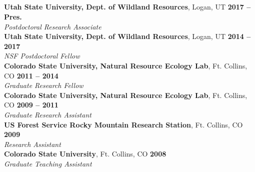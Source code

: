 \documentclass[margin,line]{resume}
\begin{document}
\begin{resume}
    \section{\textmd{\textsf{\color{MidnightBlue}{Professional\\Appointments}}}}
    \textbf{Utah State University, Dept. of Wildland Resources}, Logan, UT  \hfill \textbf{2017 -- Pres.} \\ %
		\textsl{Postdoctoral Research Associate} \vspace{.5mm}\\ 
    \textbf{Utah State University, Dept. of Wildland Resources}, Logan, UT \hfill \textbf{2014 -- 2017} \\
		\textsl{NSF Postdoctoral Fellow} \vspace{.5mm}\\
    \textbf{Colorado State University, Natural Resource Ecology Lab}, Ft. Collins, CO \hfill \textbf{2011 -- 2014}\\
		\textsl{Graduate Research Fellow}\vspace{.5mm}\\ 
    \textbf{Colorado State University, Natural Resource Ecology Lab}, Ft. Collins, CO \hfill \textbf{2009 -- 2011}\\
		\textsl{Graduate Research Assistant}\vspace{.5mm}\\ 
     \textbf{US Forest Service Rocky Mountain Research Station}, Ft. Collins, CO \hfill \textbf{2009}\\
		\textsl{Research Assistant}\vspace{.5mm}\\ 		
     \textbf{Colorado State University}, Ft. Collins, CO \hfill \textbf{2008}\\
		\textsl{Graduate Teaching Assistant}\\ 


\end{resume}
\end{document}
